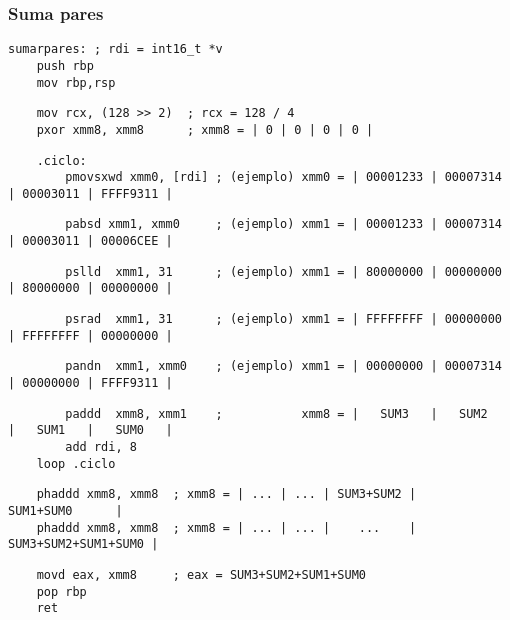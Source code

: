 \documentclass[aspectratio=169]{beamer}
\begin{document}
\begin{frame}[fragile]
    \frametitle{Suma pares}
    \scriptsize
    \begin{verbatim}
sumarpares: ; rdi = int16_t *v
    push rbp
    mov rbp,rsp
    \end{verbatim}
    \vspace{-0.8cm} \pause
    \begin{verbatim}
    mov rcx, (128 >> 2)  ; rcx = 128 / 4
    pxor xmm8, xmm8      ; xmm8 = | 0 | 0 | 0 | 0 |
    \end{verbatim}
    \vspace{-0.8cm} \pause
    \begin{verbatim}
    .ciclo:
        pmovsxwd xmm0, [rdi] ; (ejemplo) xmm0 = | 00001233 | 00007314 | 00003011 | FFFF9311 |
    \end{verbatim}
    \vspace{-0.9cm} \pause
    \begin{verbatim}
        pabsd xmm1, xmm0     ; (ejemplo) xmm1 = | 00001233 | 00007314 | 00003011 | 00006CEE |
    \end{verbatim}
    \vspace{-0.9cm} \pause
    \begin{verbatim}
        pslld  xmm1, 31      ; (ejemplo) xmm1 = | 80000000 | 00000000 | 80000000 | 00000000 |
    \end{verbatim}
    \vspace{-0.9cm} \pause
    \begin{verbatim}
        psrad  xmm1, 31      ; (ejemplo) xmm1 = | FFFFFFFF | 00000000 | FFFFFFFF | 00000000 |
    \end{verbatim}
    \vspace{-0.9cm} \pause
    \begin{verbatim}
        pandn  xmm1, xmm0    ; (ejemplo) xmm1 = | 00000000 | 00007314 | 00000000 | FFFF9311 |
    \end{verbatim}
    \vspace{-0.9cm} \pause
    \begin{verbatim}
        paddd  xmm8, xmm1    ;           xmm8 = |   SUM3   |   SUM2   |   SUM1   |   SUM0   |
        add rdi, 8
    loop .ciclo
    \end{verbatim}
    \vspace{-0.8cm} \pause
    \begin{verbatim}
    phaddd xmm8, xmm8  ; xmm8 = | ... | ... | SUM3+SUM2 |      SUM1+SUM0      |
    phaddd xmm8, xmm8  ; xmm8 = | ... | ... |    ...    | SUM3+SUM2+SUM1+SUM0 |
    \end{verbatim}
    \vspace{-0.8cm} \pause
    \begin{verbatim}
    movd eax, xmm8     ; eax = SUM3+SUM2+SUM1+SUM0
    pop rbp
    ret
    \end{verbatim}
\end{frame}
\end{document}
